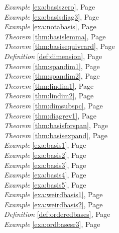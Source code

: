 \begin{multicols}{3}
\begin{center}
      \textit{Example} \ref{exa:basiszero}, Page \pageref{exa:basiszero} \\
      \textit{Example} \ref{exa:basisdiag3}, Page \pageref{exa:basisdiag3} \\
      \textit{Example} \ref{exa:notabasis}, Page \pageref{exa:notabasis} \\
      \textit{Theorem} \ref{thm:basislemma}, Page \pageref{thm:basislemma} \\
      \textit{Theorem} \ref{thm:basisequivcard}, Page \pageref{thm:basisequivcard} \\
      \textit{Definition} \ref{def:dimension}, Page \pageref{def:dimension} \\
      \textit{Theorem} \ref{thm:spandim1}, Page \pageref{thm:spandim1} \\
      \textit{Theorem} \ref{thm:spandim2}, Page \pageref{thm:spandim2} \\
      \textit{Theorem} \ref{thm:lindim1}, Page \pageref{thm:lindim1} \\
      \textit{Theorem} \ref{thm:lindim2}, Page \pageref{thm:lindim2} \\
      \textit{Theorem} \ref{thm:dimsubspc}, Page \pageref{thm:dimsubspc} \\
      \textit{Theorem} \ref{thm:diagrev1}, Page \pageref{thm:diagrev1} \\
      \textit{Theorem} \ref{thm:basisforspan}, Page \pageref{thm:basisforspan} \\
      \textit{Theorem} \ref{thm:basisexpand}, Page \pageref{thm:basisexpand} \\
      \textit{Example} \ref{exa:basis1}, Page \pageref{exa:basis1} \\
      \textit{Example} \ref{exa:basis2}, Page \pageref{exa:basis2} \\
      \textit{Example} \ref{exa:basis3}, Page \pageref{exa:basis3} \\
      \textit{Example} \ref{exa:basis4}, Page \pageref{exa:basis4} \\
      \textit{Example} \ref{exa:basis5}, Page \pageref{exa:basis5} \\
      \textit{Example} \ref{exa:weirdbasis1}, Page \pageref{exa:weirdbasis1} \\
      \textit{Example} \ref{exa:weirdbasis2}, Page \pageref{exa:weirdbasis2} \\
      \textit{Definition} \ref{def:orderedbases}, Page \pageref{def:orderedbases} \\
      \textit{Example} \ref{exa:ordbasesr3}, Page \pageref{exa:ordbasesr3} \\

\end{center}
\end{multicols}
